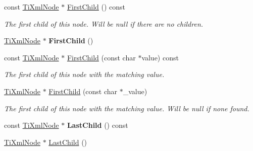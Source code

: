 \begin{DoxyCompactItemize}
\item 
const \hyperlink{class_ti_xml_node}{Ti\+Xml\+Node} $\ast$ \hyperlink{class_ti_xml_node_a44c8eee26bbe2d1b2762038df9dde2f0}{First\+Child} () const \hypertarget{class_ti_xml_node_a44c8eee26bbe2d1b2762038df9dde2f0}{}\label{class_ti_xml_node_a44c8eee26bbe2d1b2762038df9dde2f0}

\begin{DoxyCompactList}\small\item\em The first child of this node. Will be null if there are no children. \end{DoxyCompactList}\item 
\hyperlink{class_ti_xml_node}{Ti\+Xml\+Node} $\ast$ {\bfseries First\+Child} ()\hypertarget{class_ti_xml_node_a5e97d69b7c0ebd27fb7286be56559b77}{}\label{class_ti_xml_node_a5e97d69b7c0ebd27fb7286be56559b77}

\item 
const \hyperlink{class_ti_xml_node}{Ti\+Xml\+Node} $\ast$ \hyperlink{class_ti_xml_node_ab5f722624113c8203227de4f56576d31}{First\+Child} (const char $\ast$value) const 
\begin{DoxyCompactList}\small\item\em The first child of this node with the matching \textquotesingle{}value\textquotesingle{}. \end{DoxyCompactList}\item 
\hyperlink{class_ti_xml_node}{Ti\+Xml\+Node} $\ast$ \hyperlink{class_ti_xml_node_abc8bf32be6419ec453a731868de19554}{First\+Child} (const char $\ast$\+\_\+value)\hypertarget{class_ti_xml_node_abc8bf32be6419ec453a731868de19554}{}\label{class_ti_xml_node_abc8bf32be6419ec453a731868de19554}

\begin{DoxyCompactList}\small\item\em The first child of this node with the matching \textquotesingle{}value\textquotesingle{}. Will be null if none found. \end{DoxyCompactList}\item 
const \hyperlink{class_ti_xml_node}{Ti\+Xml\+Node} $\ast$ {\bfseries Last\+Child} () const \hypertarget{class_ti_xml_node_a6d671107e00cca1d28cb2d7f3a87a21e}{}\label{class_ti_xml_node_a6d671107e00cca1d28cb2d7f3a87a21e}

\item 
\hyperlink{class_ti_xml_node}{Ti\+Xml\+Node} $\ast$ \hyperlink{class_ti_xml_node_a6432d2b2495f6caf9cb4278df706a031}{Last\+Child} ()\hypertarget{class_ti_xml_node_a6432d2b2495f6caf9cb4278df706a031}{}\label{class_ti_xml_node_a6432d2b2495f6caf9cb4278df706a031}


\end{DoxyCompactItemize}
